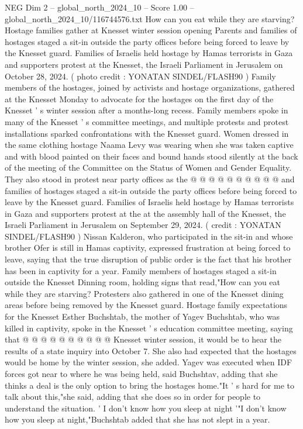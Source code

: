 \begin{textsample}{NEG Dim 2 – global\_north\_2024\_10 – Score 1.00 – global\_north\_2024\_10/116744576.txt}  \label{ex:f2_neg_370}
How can you eat while they are starving?
Hostage families gather at Knesset winter session opening Parents and families of hostages staged a sit-in outside the party offices before being forced to leave by the Knesset guard.
Families of Israelis held hostage by Hamas terrorists in Gaza and supporters protest at the Knesset, the Israeli Parliament in Jerusalem on October 28, 2024. ( photo credit : YONATAN SINDEL/FLASH90 ) Family members of the hostages, joined by activists and hostage organizations, gathered at the Knesset Monday to advocate for the hostages on the first day of the Knesset ' s winter session after a months-long recess.
Family members spoke in many of the Knesset ' s committee meetings, and multiple protests and protest installations sparked confrontations with the Knesset guard.
Women dressed in the same clothing hostage Naama Levy was wearing when she was taken captive and with blood painted on their faces and bound hands stood silently at the back of the meeting of the Committee on the Status of Women and Gender Equality.
They also stood in protest near party offices as the @ @ @ @ @ @ @ @ @ @ and families of hostages staged a sit-in outside the party offices before being forced to leave by the Knesset guard.
Families of Israelis held hostage by Hamas terrorists in Gaza and supporters protest at the at the assembly hall of the Knesset, the Israeli Parliament in Jerusalem on September 29, 2024. ( credit : YONATAN SINDEL/FLASH90 ) Nissan Kalderon, who participated in the sit-in and whose brother Ofer is still in Hamas captivity, expressed frustration at being forced to leave, saying that the true disruption of public order is the fact that his brother has been in captivity for a year.
Family members of hostages staged a sit-in outside the Knesset Dinning room, holding signs that read,"How can you eat while they are starving?
Protesters also gathered in one of the Knesset dining areas before being removed by the Knesset guard.
Hostage family expectations for the Knesset Esther Buchshtab, the mother of Yagev Buchshtab, who was killed in captivity, spoke in the Knesset ' s education committee meeting, saying that @ @ @ @ @ @ @ @ @ @ Knesset winter session, it would be to hear the results of a state inquiry into October 7.
She also had expected that the hostages would be home by the winter session, she added.
Yagev was executed when IDF forces got near to where he was being held, said Buchshtav, adding that she thinks a deal is the only option to bring the hostages home."It ' s hard for me to talk about this,"she said, adding that she does so in order for people to understand the situation. ' I don't know how you sleep at night '"I don't know how you sleep at night,"Buchshtab added that she has not slept in a year.

\end{textsample}
